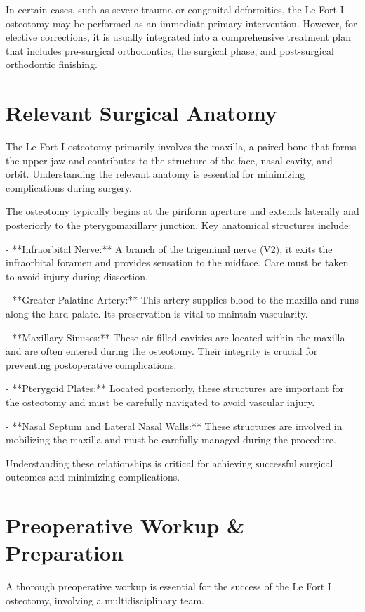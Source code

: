 In certain cases, such as severe trauma or congenital deformities, the Le Fort I osteotomy may be performed as an immediate primary intervention. However, for elective corrections, it is usually integrated into a comprehensive treatment plan that includes pre-surgical orthodontics, the surgical phase, and post-surgical orthodontic finishing.

\section*{Relevant Surgical Anatomy}
The Le Fort I osteotomy primarily involves the maxilla, a paired bone that forms the upper jaw and contributes to the structure of the face, nasal cavity, and orbit. Understanding the relevant anatomy is essential for minimizing complications during surgery. 

The osteotomy typically begins at the piriform aperture and extends laterally and posteriorly to the pterygomaxillary junction. Key anatomical structures include:

- **Infraorbital Nerve:** A branch of the trigeminal nerve (V2), it exits the infraorbital foramen and provides sensation to the midface. Care must be taken to avoid injury during dissection.
  
- **Greater Palatine Artery:** This artery supplies blood to the maxilla and runs along the hard palate. Its preservation is vital to maintain vascularity.
  
- **Maxillary Sinuses:** These air-filled cavities are located within the maxilla and are often entered during the osteotomy. Their integrity is crucial for preventing postoperative complications.
  
- **Pterygoid Plates:** Located posteriorly, these structures are important for the osteotomy and must be carefully navigated to avoid vascular injury.

- **Nasal Septum and Lateral Nasal Walls:** These structures are involved in mobilizing the maxilla and must be carefully managed during the procedure.

Understanding these relationships is critical for achieving successful surgical outcomes and minimizing complications.

\section*{Preoperative Workup \& Preparation}
A thorough preoperative workup is essential for the success of the Le Fort I osteotomy, involving a multidisciplinary team.

